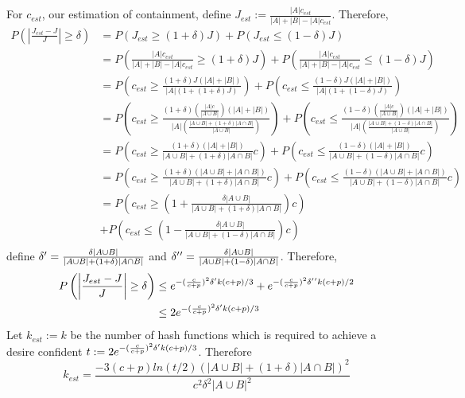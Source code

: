 \documentclass[11pt]{amsart}
\theoremstyle{remark}
\numberwithin{equation}{section}
\begin{document}
For $c_{est}$, our estimation of containment, define $J_{est}:=\frac{|A|c_{est}}{|A|+|B|-|A|c_{est}}$. Therefore,
\begin{align*}
P\left(\left|\frac{J_{est}-J}{J}\right|\geq \delta\right) &= P(J_{est}\geq (1+\delta)J)+P(J_{est}\leq (1-\delta)J)\\
&= P\left(\frac{|A|c_{est}}{|A|+|B|-|A|c_{est}}\geq (1+\delta)J\right)+P\left(\frac{|A|c_{est}}{|A|+|B|-|A|c_{est}}\leq (1-\delta)J\right)\\
&= P\left(c_{est}\geq\frac{ (1+\delta)J(|A|+|B|)}{|A|(1+(1+\delta)J)} \right)+P\left(c_{est}\leq\frac{ (1-\delta)J(|A|+|B|)}{|A|(1+(1-\delta)J)} \right)\\
&= P\left(c_{est}\geq\frac{ (1+\delta)(\frac{|A|c}{|A\cup B|})(|A|+|B|)}{|A|(\frac{|A\cup B|+(1+\delta)|A \cap B|}{|A\cup B|})} \right)+P\left(c_{est}\leq\frac{ (1-\delta)(\frac{|A|c}{|A\cup B|})(|A|+|B|)}{|A|(\frac{|A\cup B|+(1-\delta)|A \cap B|}{|A\cup B|})} \right)\\
&= P\left(c_{est}\geq\frac{ (1+\delta)(|A|+|B|)}{|A\cup B|+(1+\delta)|A \cap B|} c \right)+P\left(c_{est}\leq\frac{ (1-\delta)(|A|+|B|)}{|A\cup B|+(1-\delta)|A \cap B|} c \right)\\
&= P\left(c_{est}\geq\frac{ (1+\delta)(|A \cup B|+|A \cap B|)}{|A\cup B|+(1+\delta)|A \cap B|} c \right)+P\left(c_{est}\leq\frac{ (1-\delta)(|A \cup B|+|A \cap B|)}{|A\cup B|+(1-\delta)|A \cap B|} c \right)\\
&= P\left(c_{est}\geq\left(1+\frac{\delta |A \cup B|}{|A\cup B|+(1+\delta)|A \cap B|}\right) c \right)\\
&+P\left(c_{est}\leq\left(1-\frac{ \delta |A \cup B|}{|A\cup B|+(1-\delta)|A \cap B|}\right) c \right)\\
\end{align*}
define $\delta\rq{}= \frac{\delta |A \cup B|}{|A\cup B|+(1+\delta)|A \cap B|}$ and $\delta\rq{}\rq{}=\frac{\delta |A \cup B|}{|A\cup B|+(1-\delta)|A \cap B|}$. Therefore,
\begin{align*}
P\left(\left|\frac{J_{est}-J}{J}\right|\geq \delta\right) &\leq e^{-(\frac{c}{c+p})^2\delta\rq{}k(c+p)/3}+e^{-(\frac{c}{c+p})^2\delta\rq{}\rq{}k(c+p)/2}\\
&\leq 2e^{-(\frac{c}{c+p})^2\delta\rq{}k(c+p)/3}
\end{align*}
Let $k_{est}:=k$ be the number of hash functions which is required to achieve a desire confident $t:=2e^{-(\frac{c}{c+p})^2\delta\rq{}k(c+p)/3}$. Therefore
 $$k_{est} =\frac{-3(c+p)ln(t/2)\left(|A\cup B|+(1+\delta)|A\cap B|\right)^2}{c^2\delta^2|A\cup B|^2 } $$
\end{document}
